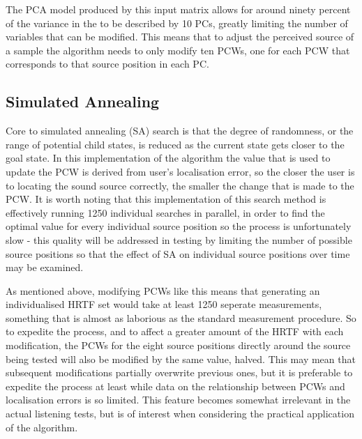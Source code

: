 The PCA model produced by this input matrix allows for around ninety percent of the variance in the to be described by 10 PCs, greatly limiting the number of variables that can be modified. This means that to adjust the perceived source of a sample the algorithm needs to only modify ten PCWs, one for each PCW that corresponds to that source position in each PC. 

\subsection{Simulated Annealing}
Core to simulated annealing (SA) search is that the degree of randomness, or the range of potential child states, is reduced as the current state gets closer to the goal state. In this implementation of the algorithm the value that is used to update the PCW is derived from user's localisation error, so the closer the user is to locating the sound source correctly, the smaller the change that is made to the PCW. It is worth noting that this implementation of this search method is effectively running 1250 individual searches in parallel, in order to find the optimal value for every individual source position so the process is unfortunately slow - this quality will be addressed in testing by limiting the number of possible source positions so that the effect of SA on individual source positions over time may be examined.

As mentioned above, modifying PCWs like this means that generating an individualised HRTF set would take at least 1250 seperate measurements, something that is almost as laborious as the standard measurement procedure. So to expedite the process, and to affect a greater amount of the HRTF with each modification, the PCWs for the eight source positions directly around the source being tested will also be modified by the same value, halved. This may mean that subsequent modifications partially overwrite previous ones, but it is preferable to expedite the process at least while data on the relationship between PCWs and localisation errors is so limited. This feature becomes somewhat irrelevant in the actual listening tests, but is of interest when considering the practical application of the algorithm.

